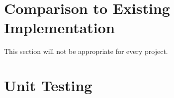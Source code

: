 \documentclass[12pt, titlepage]{article}
\begin{document}

	
\section{Comparison to Existing Implementation}	

This section will not be appropriate for every project.

\section{Unit Testing}
\end{document}
